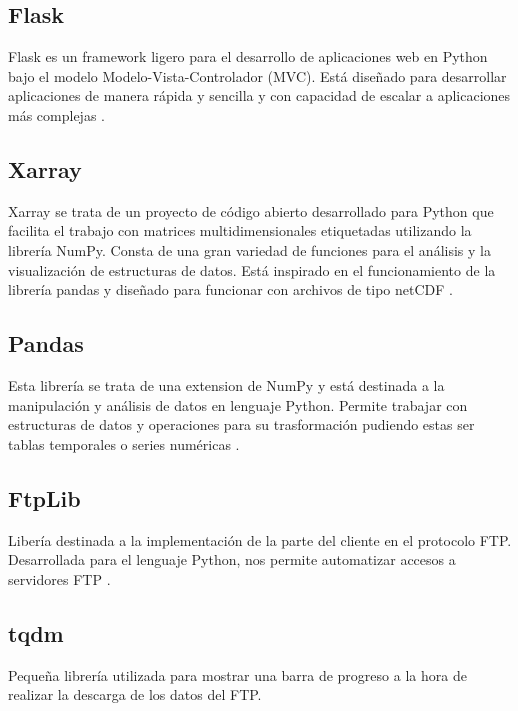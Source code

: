 	\subsection{Flask}\label{Flask}
Flask es un framework ligero para el desarrollo de aplicaciones web en Python bajo el modelo Modelo-Vista-Controlador (MVC). Está diseñado para desarrollar aplicaciones de manera rápida y sencilla y con capacidad de escalar a aplicaciones más complejas \cite{flask}.
	\subsection{Xarray}\label{xarray}
Xarray se trata de un proyecto de código abierto desarrollado para Python que facilita el trabajo con matrices multidimensionales etiquetadas utilizando la librería NumPy. Consta de una gran variedad de funciones para el análisis y la visualización de estructuras de datos. Está inspirado en el funcionamiento de la librería pandas y diseñado para funcionar con archivos de tipo netCDF \cite{xarray}.	
	\subsection{Pandas}\label{pandas}
Esta librería se trata de una extension de NumPy y está destinada a la manipulación y análisis de datos en lenguaje Python. Permite trabajar con estructuras de datos y operaciones para su trasformación pudiendo estas ser tablas temporales o series numéricas \cite{pandas}.
	\subsection{FtpLib}\label{FtpLib}
Libería destinada a la implementación de la parte del cliente en el protocolo FTP. Desarrollada para el lenguaje Python, nos permite automatizar accesos a servidores FTP \cite{ftp_lib}.
	\subsection{tqdm}\label{tqdm}
Pequeña librería utilizada para mostrar una barra de progreso a la hora de realizar la descarga de los datos del FTP.
